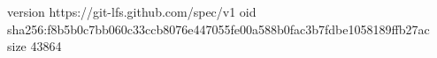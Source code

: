 version https://git-lfs.github.com/spec/v1
oid sha256:f8b5b0c7bb060c33ccb8076e447055fe00a588b0fac3b7fdbe1058189ffb27ac
size 43864
